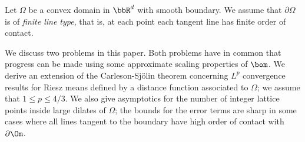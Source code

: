 \lc{\lesssim}
\gc{\gtrsim}
\ga{\gamma}             \Ga{\Gamma}
\eps{\varepsilon}                
\ep{\epsilon}
\la{\lambda}             \La{\Lambda}
\sig{\sigma}             \Sig{\Sigma}
\si{\sigma}              \Si{\Sigma}
\vphi{\varphi}
\ome{\omega}             \Ome{\Omega}
\om{\omega}              \Om{\Omega}
\ka{\kappa}
\ic{{\imath}}
\tchi{{\widetilde \chi}}
\tka{{\widetilde \kappa}}
\txi{{\widetilde \xi}}
\teta{{\widetilde \eta}}
\tomega{{\widetilde \omega}}
\tzeta{{\widetilde \zeta}}
\tpsi{{\widetilde \psi}}
\tphi{{\widetilde \phi}}
\bom{{\partial \Om}}

\endhead
 Let $\Omega$ be a convex domain in $\bbR^d$ with smooth boundary.
We assume that
$\partial \Omega$ is of {\it finite line type}, that is, at each point each tangent line has finite order of contact.

We discuss two problems in this paper.
Both problems  have in common that progress can be made using some approximate scaling  properties of $\bom$.
We derive an extension 
of the Carleson-Sj\"olin theorem concerning 
$L^p$ convergence results for Riesz means defined by a distance function 
associated  to $\Omega$; we assume  that $1\le p\le 4/3$.
We also  give asymptotics for the number of integer lattice points
inside large dilates of $\Omega$; the
bounds for the error terms are sharp in some cases where
all lines tangent to the boundary
have  high order of contact with $\partial\Om$.






